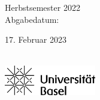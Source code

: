 \begin{center}

	Herbstsemester 2022\\
	Abgabedatum: {\large\date 017. Februar 2023}\\[2.5cm]


	\includegraphics[width=0.3\textwidth]{images/uni-basel-logo.png} %


	\end{center}

\restoregeometry

\newpage

